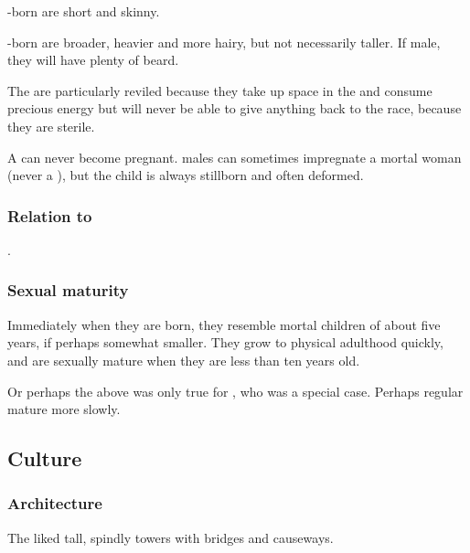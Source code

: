 \begin{gloss}
  \Human-born \resphain{} are short and skinny. 
  
  \Nephil-born \resphain{} are broader, heavier and more hairy, but not necessarily taller. 
  If male, they will have plenty of beard. 
  
  The \bezedeth{} are particularly reviled because they take up space in the  and consume precious  energy but will never be able to give anything back to the \resphan{} race, because they are sterile. 
  
  A \bezed{} \resvil{} can never become pregnant. 
  \Bezed{} males can sometimes impregnate a mortal woman (never a \resvil), but the child is always stillborn and often deformed. 
\end{gloss}





\subsubsection{Relation to \aryothim}
.





\subsubsection{Sexual maturity}
Immediately when they are born, they resemble mortal children of about five years, if perhaps somewhat smaller. 
They grow to physical adulthood quickly, and are sexually mature when they are less than ten years old. 

Or perhaps the above was only true for \Thanatzil, who was a special case. 
Perhaps regular \resphain{} mature more slowly. 









\subsection{Culture}





\subsubsection{Architecture}
The \resphain{} liked tall, spindly towers with bridges and causeways. 

